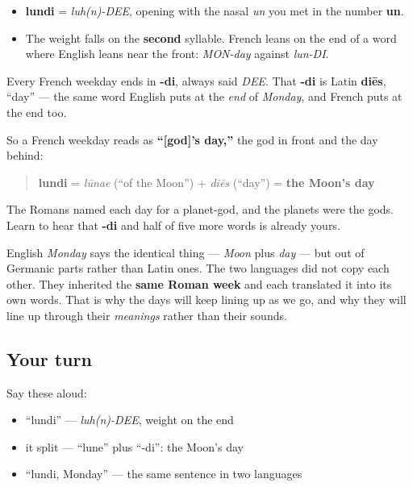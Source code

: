 \begin{sounds}
\begin{itemize}
\raggedright
  \item \textbf{lundi} = \emph{luh(n)-DEE}, opening with the nasal \emph{un} you met in the number \textbf{un}.
  \item The weight falls on the \textbf{second} syllable. French leans on the end of a word where English leans near the front: \emph{MON-day} against \emph{lun-DI}.
\end{itemize}
\end{sounds}

\begin{grammarlens}[title={Grammar Lens: every weekday ends in \textquotedblleft{}day\textquotedblright{}}]
Every French weekday ends in \textbf{-di}, always said \emph{DEE}. That \textbf{-di} is Latin \textbf{diēs}, \textquotedblleft{}day\textquotedblright{} — the same word English puts at the \emph{end} of \emph{Monday}, and French puts at the end too.

So a French weekday reads as \textbf{\textquotedblleft{}{[}god{]}'s day,\textquotedblright{}} the god in front and the day behind:

\begin{quote}
\textbf{lundi} = \emph{lūnae} (\textquotedblleft{}of the Moon\textquotedblright{}) + \emph{diēs} (\textquotedblleft{}day\textquotedblright{}) = \textbf{the Moon's day}
\end{quote}

The Romans named each day for a planet-god, and the planets were the gods. Learn to hear that \textbf{-di} and half of five more words is already yours.
\end{grammarlens}

\begin{culture}
English \emph{Monday} says the identical thing — \emph{Moon} plus \emph{day} — but out of Germanic parts rather than Latin ones. The two languages did not copy each other. They inherited the \textbf{same Roman week} and each translated it into its own words. That is why the days will keep lining up as we go, and why they will line up through their \emph{meanings} rather than their sounds.
\end{culture}

\subsection*{Your turn}
Say these aloud:

\begin{itemize}
\raggedright
  \item \textquotedblleft{}lundi\textquotedblright{} — \emph{luh(n)-DEE}, weight on the end
  \item it split — \textquotedblleft{}lune\textquotedblright{} plus \textquotedblleft{}-di\textquotedblright{}: the Moon's day
  \item \textquotedblleft{}lundi, Monday\textquotedblright{} — the same sentence in two languages
\end{itemize}

